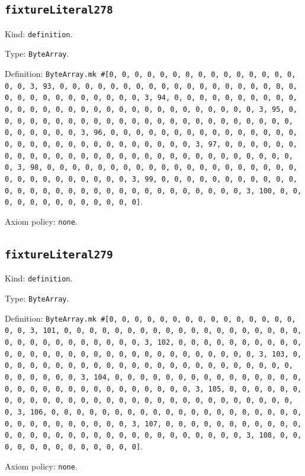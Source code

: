 \documentclass[11pt]{article}
\begin{document}
\subsection*{\texttt{fixtureLiteral278}}
\noindent Kind: \texttt{definition}.\par
\noindent Type: \texttt{ByteArray}.\par
\noindent Definition: \texttt{ByteArray.mk \#[0, 0, 0, 0, 0, 0, 0, 0, 0, 0, 0, 0, 0, 0, 0, 0, 0, 3, 93, 0, 0, 0, 0, 0, 0, 0, 0, 0, 0, 0, 0, 0, 0, 0, 0, 0, 0, 0, 0, 0, 0, 0, 0, 0, 0, 0, 0, 0, 0, 3, 94, 0, 0, 0, 0, 0, 0, 0, 0, 0, 0, 0, 0, 0, 0, 0, 0, 0, 0, 0, 0, 0, 0, 0, 0, 0, 0, 0, 0, 0, 0, 3, 95, 0, 0, 0, 0, 0, 0, 0, 0, 0, 0, 0, 0, 0, 0, 0, 0, 0, 0, 0, 0, 0, 0, 0, 0, 0, 0, 0, 0, 0, 0, 3, 96, 0, 0, 0, 0, 0, 0, 0, 0, 0, 0, 0, 0, 0, 0, 0, 0, 0, 0, 0, 0, 0, 0, 0, 0, 0, 0, 0, 0, 0, 0, 3, 97, 0, 0, 0, 0, 0, 0, 0, 0, 0, 0, 0, 0, 0, 0, 0, 0, 0, 0, 0, 0, 0, 0, 0, 0, 0, 0, 0, 0, 0, 0, 3, 98, 0, 0, 0, 0, 0, 0, 0, 0, 0, 0, 0, 0, 0, 0, 0, 0, 0, 0, 0, 0, 0, 0, 0, 0, 0, 0, 0, 0, 0, 0, 3, 99, 0, 0, 0, 0, 0, 0, 0, 0, 0, 0, 0, 0, 0, 0, 0, 0, 0, 0, 0, 0, 0, 0, 0, 0, 0, 0, 0, 0, 0, 0, 3, 100, 0, 0, 0, 0, 0, 0, 0, 0, 0, 0, 0, 0, 0]}.\par
\noindent Axiom policy: \texttt{none}.\par
\subsection*{\texttt{fixtureLiteral279}}
\noindent Kind: \texttt{definition}.\par
\noindent Type: \texttt{ByteArray}.\par
\noindent Definition: \texttt{ByteArray.mk \#[0, 0, 0, 0, 0, 0, 0, 0, 0, 0, 0, 0, 0, 0, 0, 0, 0, 3, 101, 0, 0, 0, 0, 0, 0, 0, 0, 0, 0, 0, 0, 0, 0, 0, 0, 0, 0, 0, 0, 0, 0, 0, 0, 0, 0, 0, 0, 0, 0, 3, 102, 0, 0, 0, 0, 0, 0, 0, 0, 0, 0, 0, 0, 0, 0, 0, 0, 0, 0, 0, 0, 0, 0, 0, 0, 0, 0, 0, 0, 0, 0, 3, 103, 0, 0, 0, 0, 0, 0, 0, 0, 0, 0, 0, 0, 0, 0, 0, 0, 0, 0, 0, 0, 0, 0, 0, 0, 0, 0, 0, 0, 0, 0, 3, 104, 0, 0, 0, 0, 0, 0, 0, 0, 0, 0, 0, 0, 0, 0, 0, 0, 0, 0, 0, 0, 0, 0, 0, 0, 0, 0, 0, 0, 0, 0, 3, 105, 0, 0, 0, 0, 0, 0, 0, 0, 0, 0, 0, 0, 0, 0, 0, 0, 0, 0, 0, 0, 0, 0, 0, 0, 0, 0, 0, 0, 0, 0, 3, 106, 0, 0, 0, 0, 0, 0, 0, 0, 0, 0, 0, 0, 0, 0, 0, 0, 0, 0, 0, 0, 0, 0, 0, 0, 0, 0, 0, 0, 0, 0, 3, 107, 0, 0, 0, 0, 0, 0, 0, 0, 0, 0, 0, 0, 0, 0, 0, 0, 0, 0, 0, 0, 0, 0, 0, 0, 0, 0, 0, 0, 0, 0, 3, 108, 0, 0, 0, 0, 0, 0, 0, 0, 0, 0, 0, 0, 0]}.\par
\noindent Axiom policy: \texttt{none}.\par
\end{document}
